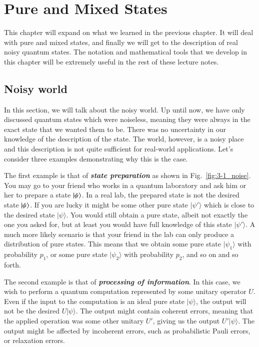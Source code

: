 \chapter[Pure and Mixed States]{Pure and Mixed States}
\label{sec:3_pure_mixed}

This chapter will expand on what we learned in the previous chapter.
It will deal with pure and mixed states, and finally we will get to the description of real noisy quantum states.
The notation and mathematical tools that we develop in this chapter will be extremely useful in the rest of these lecture notes.

\section{Noisy world}
\label{sec:3-1_noisy_world}

In this section, we will talk about the noisy world.
Up until now, we have only discussed quantum states which were noiseless, meaning they
were always in the exact state that we wanted them to be.
There was no uncertainty in our knowledge of the description of the state.
The world, however, is a noisy place and this description is not quite sufficient for real-world applications.
Let's consider three examples demonstrating why this is the case.

The first example is that of \textit{\textbf{state preparation}} as shown in Fig.~\ref{fig:3-1_noise}.
You may go to your friend who works in a quantum laboratory and ask him or her to prepare
a state $\left| \psi \right\rangle$.
In a real lab, the prepared state is not the desired state $\left| \psi \right\rangle$.
If you are lucky it might be some other pure state $|\psi'\rangle$ which is close to the desired state $|\psi\rangle$.
You would still obtain a pure state, albeit not exactly the one you asked for, but at least you would have full knowledge of this state $|\psi'\rangle$.
A much more likely scenario is that your friend in the lab can only produce a distribution of pure states.
This means that we obtain some pure state $|\psi_1\rangle$ with probability $p_1$, or some pure state $|\psi_2\rangle$ with probability $p_2$, and so on and so forth.

The second example is that of \textit{\textbf{processing of information}}.
In this case, we wish to perform a quantum computation represented by some unitary operator $U$.
Even if the input to the computation is an ideal pure state $|\psi\rangle$, the output will not be the desired $U|\psi\rangle$.
The output might contain coherent errors, meaning that the applied operation was some other unitary $U'$, giving us the output $U'|\psi\rangle$.
The output might be affected by incoherent errors, such as probabilistic Pauli errors, or relaxation errors.

